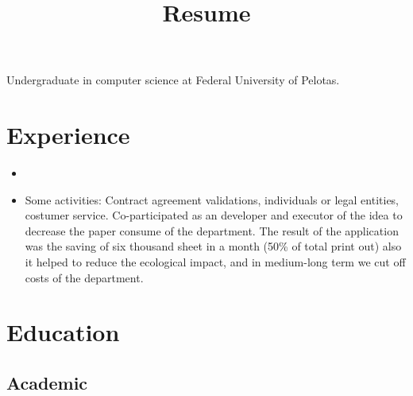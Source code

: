 \documentclass[11pt,a4paper,sans]{moderncv}        %
\title{Resume}                               %
\begin{document}
\makecvtitle

\small{Undergraduate in computer science at Federal University of Pelotas.}

\section{Experience}

\vspace{6pt}

\begin{itemize}
\item{}

\vspace{6pt}

\item{
{\vspace{3pt}Some activities: Contract agreement validations, individuals or legal entities, costumer service. Co-participated as an developer and executor of the idea to decrease the paper consume of the department. The result of the application was the saving of six thousand sheet in a month (50\% of total print out) also it helped to reduce the ecological impact, and in medium-long term we cut off costs of the department.}}

\vspace{6pt}

\end{itemize}

\section{Education}

\vspace{5pt}

\subsection{Academic}
\end{document}
